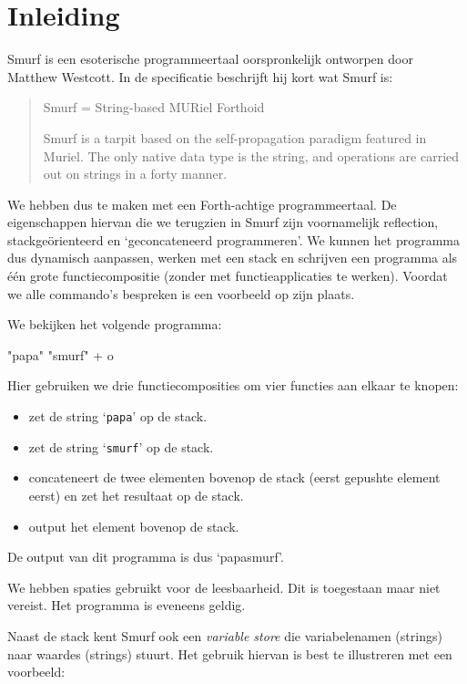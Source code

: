 \section{Inleiding}
\label{sec:intro}

Smurf is een esoterische programmeertaal oorspronkelijk ontworpen door Matthew
Westcott. In de specificatie \cite{safalra} beschrijft hij kort wat Smurf is:
\begin{quote}
	Smurf = String-based MURiel Forthoid

	Smurf is a tarpit based on the self-propagation paradigm featured in Muriel.
	The only native data type is the string, and operations are carried out on
	strings in a forty manner.
\end{quote}
We hebben dus te maken met een Forth-achtige programmeertaal. De eigenschappen
hiervan die we terugzien in Smurf zijn voornamelijk reflection,
stackgeörienteerd en `geconcateneerd programmeren'. We kunnen het programma dus
dynamisch aanpassen, werken met een stack en schrijven een programma als één
grote functiecompositie (zonder met functieapplicaties te werken). Voordat we
alle commando's bespreken is een voorbeeld op zijn plaats.

\begin{exmp}
	We bekijken het volgende programma:
	\begin{smurf}"papa" "smurf" + o\end{smurf}
	Hier gebruiken we drie functiecomposities om vier functies aan elkaar te
	knopen:
	\begin{itemize}
		\item {} zet de string `\texttt{papa}' op de stack.
		\item {} zet de string `\texttt{smurf}' op de stack.
		\item \smurfinline{+} concateneert de twee elementen bovenop de stack
			(eerst gepushte element eerst) en zet het resultaat op de stack.
		\item {} output het element bovenop de stack.
	\end{itemize}
	De output van dit programma is dus `papasmurf'.

	We hebben spaties gebruikt voor de leesbaarheid. Dit is toegestaan maar niet
	vereist. Het programma  is eveneens geldig.
\end{exmp}

Naast de stack kent Smurf ook een \emph{variable store} die variabelenamen
(strings) naar waardes (strings) stuurt. Het gebruik hiervan is best te
illustreren met een voorbeeld:

